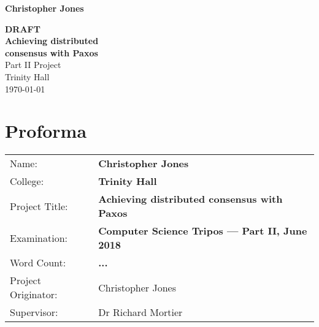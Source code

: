 \documentclass[12pt,twoside,notitlepage]{report}
\begin{document}





\pagestyle{empty}

\hfill{\LARGE \bf Christopher Jones}

\vspace*{60mm}
\begin{center}
\Huge
{\bf \color{red} DRAFT} \\
{\bf Achieving distributed \\ consensus with Paxos} \\
\vspace*{5mm}
Part II Project \\
\vspace*{5mm}
Trinity Hall \\
\vspace*{5mm}
\today  %
\end{center}

\cleardoublepage



\setcounter{page}{1}
\pagestyle{plain}

\chapter*{Proforma}

{\large
\begin{tabular}{ll}
Name:                       & \bf Christopher Jones                       \\
College:                    & \bf Trinity Hall                     \\
Project Title:             & \bf Achieving distributed consensus with Paxos \\
Examination:            & \bf Computer Science Tripos --- Part II, June 2018 \\
Word Count:            & \bf ...\footnotemark[1] \\
Project Originator:  & Christopher Jones                    \\
Supervisor:              & Dr Richard Mortier                    \\ 
\end{tabular}
}
\end{document}
